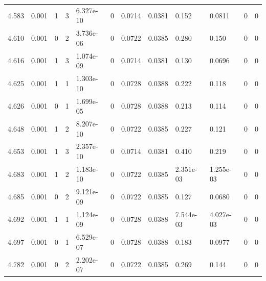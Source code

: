 \documentclass[preview]{standalone}
\begin{document}
{{{{{{\begin{tabular}{L{1.2cm}C{1.2cm} C{0.3cm}C{0.5cm} C{1.4cm}C{1.4cm} C{1.4cm}C{1.4cm} C{1.6cm}C{1.6cm} C{1.6cm}C{1.6cm}}
  4.583  &  0.001  & 1     &  3 &  6.327e-10  & 0  &  0.0714&   0.0381& 0.152 & 0.0811   &  0 & 0  \\ 
  4.610  &  0.001  & 0     &  2 &  3.736e-06  & 0  &  0.0722&   0.0385& 0.280 & 0.150   &  0 & 0  \\ 
  4.616  &  0.001  & 1     &  3 &  1.074e-09  & 0  &  0.0714&   0.0381& 0.130 & 0.0696   &  0 & 0  \\ 
  4.625  &  0.001  & 1     &  1 &  1.303e-10  & 0  &  0.0728&   0.0388& 0.222 & 0.118   &  0 & 0  \\ 
  4.626  &  0.001  & 0     &  1 &  1.699e-05  & 0  &  0.0728&   0.0388& 0.213 & 0.114   &  0 & 0  \\ 
  4.648  &  0.001  & 1     &  2 &  8.207e-10  & 0  &  0.0722&   0.0385& 0.227 & 0.121   &  0 & 0  \\ 
  4.653  &  0.001  & 1     &  3 &  2.357e-10  & 0  &  0.0714&   0.0381& 0.410 & 0.219   &  0 & 0  \\ 
  4.683  &  0.001  & 1     &  2 &  1.183e-10  & 0  &  0.0722&   0.0385& 2.351e-03 & 1.255e-03   &  0 & 0  \\ 
  4.685  &  0.001  & 0     &  2 &  9.121e-09  & 0  &  0.0722&   0.0385& 0.127 & 0.0680   &  0 & 0  \\ 
  4.692  &  0.001  & 1     &  1 &  1.124e-09  & 0  &  0.0728&   0.0388& 7.544e-03 & 4.027e-03   &  0 & 0  \\ 
  4.697  &  0.001  & 0     &  1 &  6.529e-07  & 0  &  0.0728&   0.0388& 0.183 & 0.0977   &  0 & 0  \\ 
  4.782  &  0.001  & 0     &  2 &  2.202e-07  & 0  &  0.0722&   0.0385& 0.269 & 0.144   &  0 & 0  \\ 
\hline 
\end{tabular} 

}}}}}}
\end{document}
